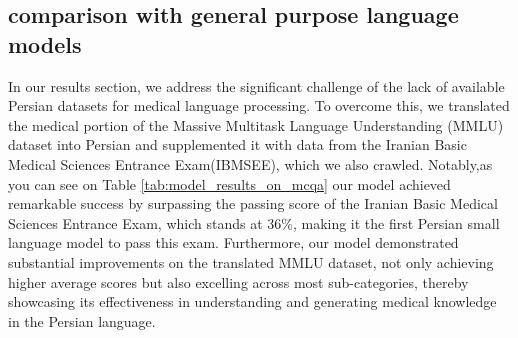 \documentclass[conference]{IEEEtran}
\begin{document}
\subsection{comparison with general purpose language models}
In our results section, we address the significant challenge of the lack of available Persian datasets for medical language processing. To overcome this, we translated the medical portion of the Massive Multitask Language Understanding (MMLU)
\cite{b18}
dataset into Persian and supplemented it with data from the Iranian Basic Medical Sciences Entrance Exam(IBMSEE), which we also crawled. Notably,as you can see on Table
\ref{tab:model_results_on_mcqa}
our model achieved remarkable success by surpassing the passing score of the Iranian Basic Medical Sciences Entrance Exam, which stands at 36\%, making it the first Persian small language model to pass this exam. Furthermore, our model demonstrated substantial improvements on the translated MMLU dataset, not only achieving higher average scores but also excelling across most sub-categories, thereby showcasing its effectiveness in understanding and generating medical knowledge in the Persian language.
\end{document}
